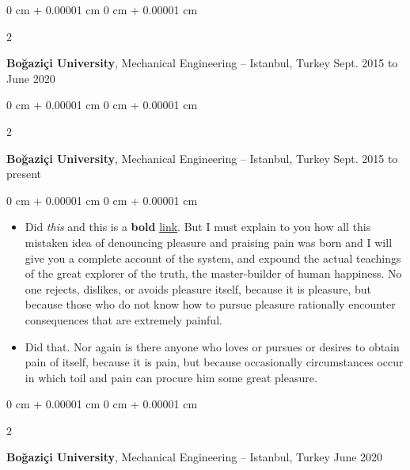 \documentclass[10pt, letterpaper]{article}
\newenvironment{highlights}{
    \begin{itemize}[
        topsep=0.10 cm,
        parsep=0.10 cm,
        partopsep=0pt,
        itemsep=0pt,
        leftmargin=0 cm + 10pt
    ]
}{
    \end{itemize}
} %
\newenvironment{onecolentry}{
    \begin{adjustwidth}{
        0 cm + 0.00001 cm
    }{
        0 cm + 0.00001 cm
    }
}{
    \end{adjustwidth}
} %
\newenvironment{twocolentry}[2][]{
    \onecolentry
    \def\secondColumn{#2}
    \setcolumnwidth{\fill, 4.5 cm}
    \begin{paracol}{2}
}{
    \switchcolumn \raggedleft \secondColumn
    \end{paracol}
    \endonecolentry
} %
\begin{document}
        \vspace{0.2 cm}

        \begin{twocolentry}{
            Sept. 2015 to June 2020
        }
            \textbf{Boğaziçi University}, Mechanical Engineering -- Istanbul, Turkey\end{twocolentry}



        \vspace{0.2 cm}

        \begin{twocolentry}{
            Sept. 2015 to present
        }
            \textbf{Boğaziçi University}, Mechanical Engineering -- Istanbul, Turkey\end{twocolentry}

        \vspace{0.10 cm}
        \begin{onecolentry}
            \begin{highlights}
                \item Did \textit{this} and this is a \textbf{bold} \href{https://example.com}{link}. But I must explain to you how all this mistaken idea of denouncing pleasure and praising pain was born and I will give you a complete account of the system, and expound the actual teachings of the great explorer of the truth, the master-builder of human happiness. No one rejects, dislikes, or avoids pleasure itself, because it is pleasure, but because those who do not know how to pursue pleasure rationally encounter consequences that are extremely painful.
                \item Did that. Nor again is there anyone who loves or pursues or desires to obtain pain of itself, because it is pain, but because occasionally circumstances occur in which toil and pain can procure him some great pleasure.
            \end{highlights}
        \end{onecolentry}


        \vspace{0.2 cm}

        \begin{twocolentry}{
            June 2020
        }
            \textbf{Boğaziçi University}, Mechanical Engineering -- Istanbul, Turkey\end{twocolentry}
\end{document}
